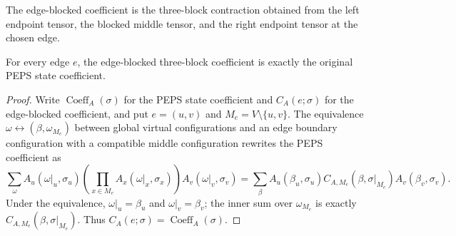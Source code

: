 \begin{definition}%
    \label{def:peps_edgeBlockedCoeff}
    \leanok
    The edge-blocked coefficient is the three-block contraction obtained from
    the left endpoint tensor, the blocked middle tensor, and the right endpoint
    tensor at the chosen edge.
\end{definition}

\begin{theorem}%
    \label{thm:peps_edgeBlockedCoeff_eq_stateCoeff}
    \leanok
    For every edge $e$, the edge-blocked three-block coefficient is exactly the
    original PEPS state coefficient.
\end{theorem}
\begin{proof}\leanok
    Write $\operatorname{Coeff}_A(\sigma)$ for the PEPS state coefficient and
    $C_A(e;\sigma)$ for the edge-blocked coefficient, and put $e=(u,v)$ and
    $M_e=V\setminus\{u,v\}$. The equivalence
    $\omega\leftrightarrow(\beta,\omega_{M_e})$ between global virtual
    configurations and an edge boundary configuration with a compatible middle
    configuration rewrites the PEPS coefficient as
    \[
        \sum_{\omega}
        A_u(\omega|_u,\sigma_u)
        \left(\prod_{x\in M_e}A_x(\omega|_x,\sigma_x)\right)
        A_v(\omega|_v,\sigma_v)
        =
        \sum_{\beta}
        A_u(\beta_u,\sigma_u)
        C_{A,M_e}(\beta,\sigma|_{M_e})
        A_v(\beta_v,\sigma_v).
    \]
    Under the equivalence, $\omega|_u=\beta_u$ and $\omega|_v=\beta_v$; the
    inner sum over $\omega_{M_e}$ is exactly $C_{A,M_e}(\beta,\sigma|_{M_e})$.
    Thus $C_A(e;\sigma)=\operatorname{Coeff}_A(\sigma)$.
\end{proof}


